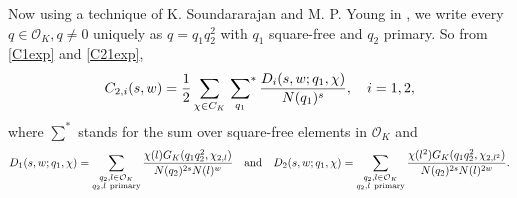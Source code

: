 \documentclass[twoside,leqno,10pt, A4]{amsart}
\begin{document}
Now using a technique of K. Soundararajan and M. P. Young in \cite[\S 3.3]{S&Y}, we write every $q \in \mathcal O_K, q \neq 0$ uniquely as $q=q_1q^2_2$ with $q_1$ square-free and $q_2$ primary.  So from \eqref{C1exp} and \eqref{C21exp},
\begin{equation} \label{Cidef}
		C_{2,i}(s,w)=\frac {1}{2}\sum_{\chi \in C_K} \sideset{}{^*}\sum_{q_1}\frac{ D_i(s, w; q_1, \chi)}{N(q_1)^s}, \quad i=1,2,
\end{equation}
where $\sum^*$ stands for the sum over square-free elements in $\mathcal O_K$ and
\begin{align}
\label{Didef}
		D_1(s, w; q_1, \chi)=\sum_{\substack{q_2, l \in \mathcal O_K \\ q_2, l \mathrm{\ primary}
}}\frac{\chi(l)G_K(q_1q^2_2,\chi_{2,l})}{N(q_2)^{2s}N(l)^w} \quad \mbox{and} \quad D_2(s, w; q_1, \chi)=\sum_{\substack{q_2, l \in \mathcal
O_K \\ q_2, l \mathrm{\ primary} }}\frac{\chi(l^2)G_K(q_1q^2_2,\chi_{2,l^2})}{N(q_2)^{2s}N(l)^{2w}}.
\end{align}
\end{document}
